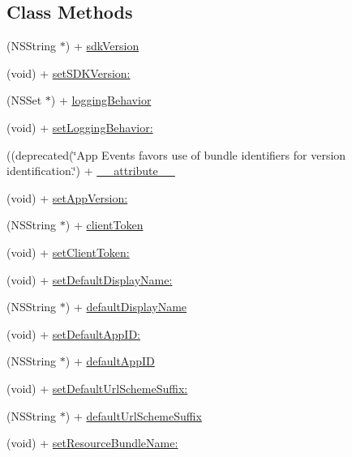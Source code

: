 \subsection*{Class Methods}
\begin{DoxyCompactItemize}
\item 
(N\+S\+String $\ast$) + \hyperlink{interfaceFBSettings_a54528a8eee1469b7202d0e4825f08604}{sdk\+Version}
\item 
(void) + \hyperlink{interfaceFBSettings_afd9810381ac6027e6400879cb68ba46e}{set\+S\+D\+K\+Version\+:}
\item 
(N\+S\+Set $\ast$) + \hyperlink{interfaceFBSettings_a6fe525188c97270c4d4a6781c4d6ee11}{logging\+Behavior}
\item 
(void) + \hyperlink{interfaceFBSettings_aaaf513653d6a8e2d05e0ecea865155c0}{set\+Logging\+Behavior\+:}
\item 
((deprecated(\char`\"{}App Events favors use of bundle identifiers for version identification.\char`\"{}) + \hyperlink{interfaceFBSettings_a2e999eddc513423b7071f27bc09589aa}{\+\_\+\+\_\+attribute\+\_\+\+\_\+}
\item 
(void) + \hyperlink{interfaceFBSettings_a01b8ded28d0bc4e050ff6eccb9a03383}{set\+App\+Version\+:}
\item 
(N\+S\+String $\ast$) + \hyperlink{interfaceFBSettings_afa1e8342398ddbdd7e6e9cd0a28094ac}{client\+Token}
\item 
(void) + \hyperlink{interfaceFBSettings_a07cfc161668c190bf5fd37934821c4de}{set\+Client\+Token\+:}
\item 
(void) + \hyperlink{interfaceFBSettings_a783ff4cf8b998eadfbfe2d95efef24a1}{set\+Default\+Display\+Name\+:}
\item 
(N\+S\+String $\ast$) + \hyperlink{interfaceFBSettings_a64b1fe4c26086a1a2bb5b162815f2786}{default\+Display\+Name}
\item 
(void) + \hyperlink{interfaceFBSettings_aae75641f83b1caf710efd2ce72b6eb67}{set\+Default\+App\+I\+D\+:}
\item 
(N\+S\+String $\ast$) + \hyperlink{interfaceFBSettings_af60cce044316df28d128d64e79a77ba5}{default\+App\+ID}
\item 
(void) + \hyperlink{interfaceFBSettings_a08a9504a71c1c9ec329e97da7c636337}{set\+Default\+Url\+Scheme\+Suffix\+:}
\item 
(N\+S\+String $\ast$) + \hyperlink{interfaceFBSettings_ae7709bddfea2d7cf28ad5e91f769dc9b}{default\+Url\+Scheme\+Suffix}
\item 
(void) + \hyperlink{interfaceFBSettings_a60a15470e22d07ad1c7d4a789712e3c1}{set\+Resource\+Bundle\+Name\+:}

\end{DoxyCompactItemize}
